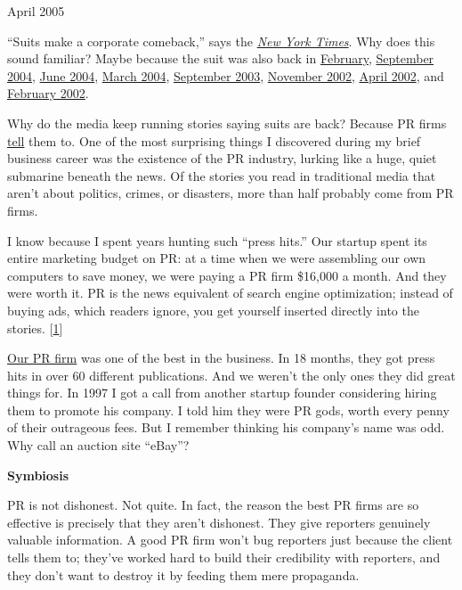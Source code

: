 April 2005

``Suits make a corporate comeback,'' says the
\href{http://www.nytimes.com/2005/04/14/fashion/thursdaystyles/14peacock.html?ex=1271131200&en=e96f2670387e3636&ei=5090&partner=rssuserland}{\emph{New
York Times}}. Why does this sound familiar? Maybe because the suit was
also back in
\href{http://www.cvbizlink.com/articles/2005/04/07/news/news/doc42406f05edf53293947237.prt}{February},
\href{http://www.usatoday.com/money/industries/retail/2004-09-01-suits_x.htm}{September
2004},
\href{http://www.cnn.com/2004/BUSINESS/06/23/go.fashion.jones/}{June
2004}, \href{http://www.post-gazette.com/pg/04062/279616.stm}{March
2004},
\href{http://www.southcoasttoday.com/daily/09-03/09-21-03/c01li238.htm}{September
2003},
\href{http://www.businessweek.com/magazine/content/02_46/b3808122.htm}{November
2002}, \href{http://www.pittsburghlive.com/x/s_65540.html}{April 2002},
and \href{http://news.bbc.co.uk/1/hi/business/1836010.stm}{February
2002}.

Why do the media keep running stories saying suits are back? Because PR
firms \href{http://www.maximumexposurepr.com/middleMAA.html}{tell} them
to. One of the most surprising things I discovered during my brief
business career was the existence of the PR industry, lurking like a
huge, quiet submarine beneath the news. Of the stories you read in
traditional media that aren't about politics, crimes, or disasters, more
than half probably come from PR firms.

I know because I spent years hunting such ``press hits.'' Our startup
spent its entire marketing budget on PR: at a time when we were
assembling our own computers to save money, we were paying a PR firm
\$16,000 a month. And they were worth it. PR is the news equivalent of
search engine optimization; instead of buying ads, which readers ignore,
you get yourself inserted directly into the stories.
{[}\hyperref[f1n]{1}{]}

\href{http://schwartz-pr.com/client_coverage.php}{Our PR firm} was one
of the best in the business. In 18 months, they got press hits in over
60 different publications. And we weren't the only ones they did great
things for. In 1997 I got a call from another startup founder
considering hiring them to promote his company. I told him they were PR
gods, worth every penny of their outrageous fees. But I remember
thinking his company's name was odd. Why call an auction site ``eBay''?

\textbf{Symbiosis}

PR is not dishonest. Not quite. In fact, the reason the best PR firms
are so effective is precisely that they aren't dishonest. They give
reporters genuinely valuable information. A good PR firm won't bug
reporters just because the client tells them to; they've worked hard to
build their credibility with reporters, and they don't want to destroy
it by feeding them mere propaganda.


